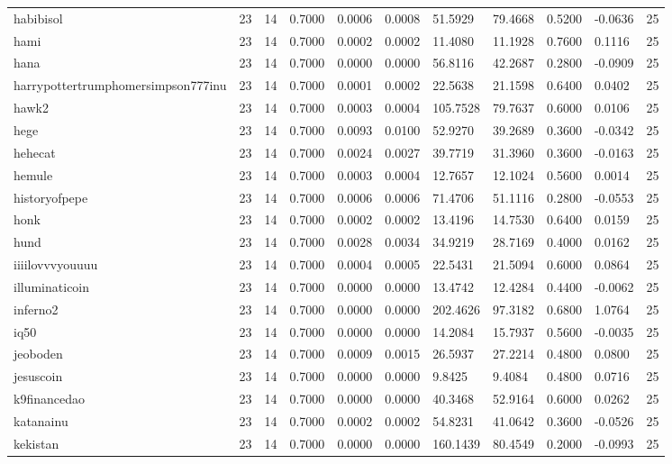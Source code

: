 \begin{table}[htbp]
\begin{tabular}{lllllllllll}
habibisol & 23 & 14 & 0.7000 & 0.0006 & 0.0008 & 51.5929 & 79.4668 & 0.5200 & -0.0636 & 25 \\
hami & 23 & 14 & 0.7000 & 0.0002 & 0.0002 & 11.4080 & 11.1928 & 0.7600 & 0.1116 & 25 \\
hana & 23 & 14 & 0.7000 & 0.0000 & 0.0000 & 56.8116 & 42.2687 & 0.2800 & -0.0909 & 25 \\
harrypottertrumphomersimpson777inu & 23 & 14 & 0.7000 & 0.0001 & 0.0002 & 22.5638 & 21.1598 & 0.6400 & 0.0402 & 25 \\
hawk2 & 23 & 14 & 0.7000 & 0.0003 & 0.0004 & 105.7528 & 79.7637 & 0.6000 & 0.0106 & 25 \\
hege & 23 & 14 & 0.7000 & 0.0093 & 0.0100 & 52.9270 & 39.2689 & 0.3600 & -0.0342 & 25 \\
hehecat & 23 & 14 & 0.7000 & 0.0024 & 0.0027 & 39.7719 & 31.3960 & 0.3600 & -0.0163 & 25 \\
hemule & 23 & 14 & 0.7000 & 0.0003 & 0.0004 & 12.7657 & 12.1024 & 0.5600 & 0.0014 & 25 \\
historyofpepe & 23 & 14 & 0.7000 & 0.0006 & 0.0006 & 71.4706 & 51.1116 & 0.2800 & -0.0553 & 25 \\
honk & 23 & 14 & 0.7000 & 0.0002 & 0.0002 & 13.4196 & 14.7530 & 0.6400 & 0.0159 & 25 \\
hund & 23 & 14 & 0.7000 & 0.0028 & 0.0034 & 34.9219 & 28.7169 & 0.4000 & 0.0162 & 25 \\
iiiilovvvyouuuu & 23 & 14 & 0.7000 & 0.0004 & 0.0005 & 22.5431 & 21.5094 & 0.6000 & 0.0864 & 25 \\
illuminaticoin & 23 & 14 & 0.7000 & 0.0000 & 0.0000 & 13.4742 & 12.4284 & 0.4400 & -0.0062 & 25 \\
inferno2 & 23 & 14 & 0.7000 & 0.0000 & 0.0000 & 202.4626 & 97.3182 & 0.6800 & 1.0764 & 25 \\
iq50 & 23 & 14 & 0.7000 & 0.0000 & 0.0000 & 14.2084 & 15.7937 & 0.5600 & -0.0035 & 25 \\
jeoboden & 23 & 14 & 0.7000 & 0.0009 & 0.0015 & 26.5937 & 27.2214 & 0.4800 & 0.0800 & 25 \\
jesuscoin & 23 & 14 & 0.7000 & 0.0000 & 0.0000 & 9.8425 & 9.4084 & 0.4800 & 0.0716 & 25 \\
k9financedao & 23 & 14 & 0.7000 & 0.0000 & 0.0000 & 40.3468 & 52.9164 & 0.6000 & 0.0262 & 25 \\
katanainu & 23 & 14 & 0.7000 & 0.0002 & 0.0002 & 54.8231 & 41.0642 & 0.3600 & -0.0526 & 25 \\
kekistan & 23 & 14 & 0.7000 & 0.0000 & 0.0000 & 160.1439 & 80.4549 & 0.2000 & -0.0993 & 25 \\

\end{tabular}
\end{table}
